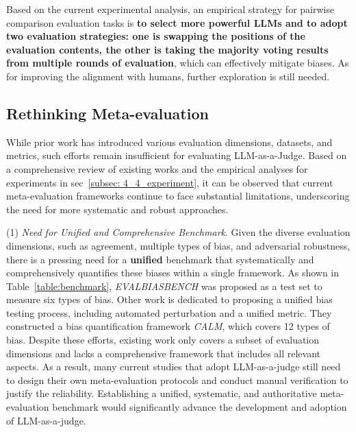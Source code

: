 \documentclass[acmsmall,screen]{acmart}
\begin{document}
Based on the current experimental analysis, an empirical strategy for pairwise comparison evaluation tasks is \textbf{to select more powerful LLMs and to adopt two evaluation strategies: one is swapping the positions of the evaluation contents, the other is taking the majority voting results from multiple rounds of evaluation}, which can effectively mitigate biases. As for improving the alignment with humans, further exploration is still needed.


\subsection{Rethinking Meta-evaluation}
\label{subsec: 4_5_rethinking_eval}


While prior work has introduced various evaluation dimensions, datasets, and metrics, such efforts remain insufficient for evaluating LLM-as-a-Judge. 
Based on a comprehensive review of existing works and the empirical analyses for experiments in sec~\ref{subsec: 4_4_experiment}, it can be observed that current meta-evaluation frameworks continue to face substantial limitations, underscoring the need for more systematic and robust approaches.

(1) \textit{Need for Unified and Comprehensive Benchmark}. 
Given the diverse evaluation dimensions, such as agreement, multiple types of bias, and adversarial robustness, there is a pressing need for a \textbf{unified} benchmark that systematically and comprehensively quantifies these biases within a single framework.
As shown in Table~\ref{table:benchmark}, 
\textit{EVALBIASBENCH} \citep{offsetbias} was proposed as a test set to measure six types of bias. 
Other work \cite{ye2024justice} is dedicated to proposing a unified bias testing process, including automated perturbation and a unified metric. 
They constructed a bias quantification framework \textit{CALM}, which covers 12 types of bias.
Despite these efforts, existing work only covers a subset of evaluation dimensions and lacks a comprehensive framework that includes all relevant aspects.
As a result, many current studies that adopt LLM-as-a-judge still need to design their own meta-evaluation protocols and conduct manual verification to justify the reliability.
Establishing a unified, systematic, and authoritative meta-evaluation benchmark would significantly advance the development and adoption of LLM-as-a-judge.
\end{document}
